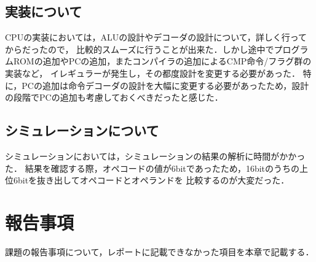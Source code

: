 \documentclass[a4paper,11pt]{ltjsarticle}
\begin{document}
\subsection{実装について}
CPUの実装においては，ALUの設計やデコーダの設計について，詳しく行ってからだったので，
比較的スムーズに行うことが出来た．しかし途中でプログラムROMの追加やPCの追加，またコンパイラの追加によるCMP命令/フラグ群の実装など，
イレギュラーが発生し，その都度設計を変更する必要があった．
特に，PCの追加は命令デコーダの設計を大幅に変更する必要があったため，設計の段階でPCの追加も考慮しておくべきだったと感じた．
\subsection{シミュレーションについて}
シミュレーションにおいては，シミュレーションの結果の解析に時間がかかった．
結果を確認する際，オペコードの値が6bitであったため，16bitのうちの上位6bitを抜き出してオペコードとオペランドを
比較するのが大変だった．
\section{報告事項}
課題の報告事項について，レポートに記載できなかった項目を本章で記載する．
\end{document}
